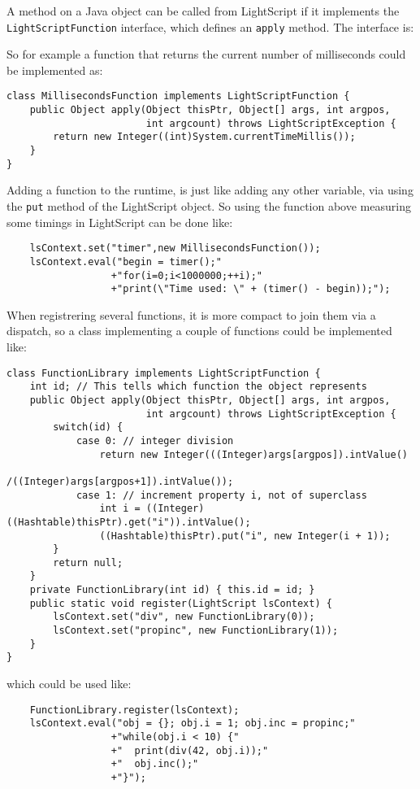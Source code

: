 \documentclass[11pt]{report}
\begin{document}
A method on a Java object can be called from LightScript if it implements the \verb|LightScriptFunction| interface, which defines an \verb|apply| method.
The interface is:

So for example a function that returns the current number of milliseconds could be implemented as:
\begin{lstlisting}
class MillisecondsFunction implements LightScriptFunction {
    public Object apply(Object thisPtr, Object[] args, int argpos, 
                        int argcount) throws LightScriptException {
        return new Integer((int)System.currentTimeMillis());
    }
}
\end{lstlisting}

Adding a function to the runtime, is just like adding any other variable,
via using the \verb|put| method of the LightScript object.
So using the function above measuring some timings in LightScript can be done like:
\begin{lstlisting}
    lsContext.set("timer",new MillisecondsFunction());
    lsContext.eval("begin = timer();"
                  +"for(i=0;i<1000000;++i);"
                  +"print(\"Time used: \" + (timer() - begin));");
\end{lstlisting}

When registrering several functions, it is more compact to join them via a dispatch, 
so a class implementing a couple of functions could be implemented like:
\begin{lstlisting}
class FunctionLibrary implements LightScriptFunction {
    int id; // This tells which function the object represents
    public Object apply(Object thisPtr, Object[] args, int argpos, 
                        int argcount) throws LightScriptException {
        switch(id) {
            case 0: // integer division
                return new Integer(((Integer)args[argpos]).intValue()
                                  /((Integer)args[argpos+1]).intValue());
            case 1: // increment property i, not of superclass
                int i = ((Integer)((Hashtable)thisPtr).get("i")).intValue();
                ((Hashtable)thisPtr).put("i", new Integer(i + 1));
        }
        return null;
    }
    private FunctionLibrary(int id) { this.id = id; }
    public static void register(LightScript lsContext) {
        lsContext.set("div", new FunctionLibrary(0));
        lsContext.set("propinc", new FunctionLibrary(1));
    }
}
\end{lstlisting}
which could be used like:
\begin{lstlisting}
    FunctionLibrary.register(lsContext);
    lsContext.eval("obj = {}; obj.i = 1; obj.inc = propinc;"
                  +"while(obj.i < 10) {"
                  +"  print(div(42, obj.i));"
                  +"  obj.inc();"
                  +"}");
\end{lstlisting}
\end{document}
